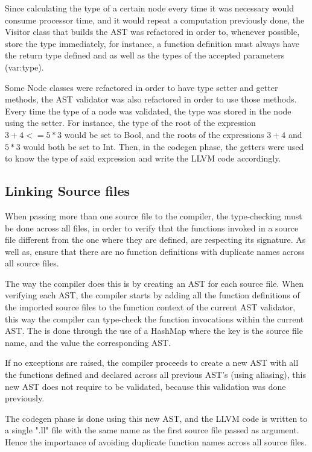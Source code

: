 \documentclass[12pt]{article}
\begin{document}
Since calculating the type of a certain node every time it was necessary would consume processor time, and it would repeat a computation previously done, the Visitor class that builds the AST was refactored in order to, whenever possible, store the type immediately, for instance, a function definition must always have the return type defined and as well as the types of the accepted parameters (var:type).

Some Node classes were refactored in order to have type setter and getter methods, the AST validator was also refactored in order to use those methods. Every time the type of a node was validated, the type was stored in the node using the setter.
For instance, the type of the root of the expression $3+4 <= 5*3$ would be set to Bool, and the roots of the expressions $3+4$ and $5*3$ would both be set to Int. Then, in the codegen phase, the getters were used to know the type of said expression and write the LLVM code accordingly.


\subsection{Linking Source files}
When passing more than one source file to the compiler, the type-checking must be done across all files, in order to verify that the functions invoked in a source file different from the one where they are defined, are respecting its signature. As well as, ensure that there are no function definitions with duplicate names across all source files.

The way the compiler does this is by creating an AST for each source file. When verifying each AST, the compiler starts by adding all the function definitions of the imported source files to the function context of the current AST validator, this way the compiler can type-check the function invocations within the current AST. The is done through the use of a HashMap where the key is the source file name, and the value the corresponding AST.

If no exceptions are raised, the compiler proceeds to create a new AST with all the functions defined and declared across all previous AST's (using aliasing), this new AST does not require to be validated, because this validation was done previously.

The codegen phase is done using this new AST, and the LLVM code is written to a single ".ll" file with the same name as the first source file passed as argument. Hence the importance of avoiding duplicate function names across all source files.
\end{document}
